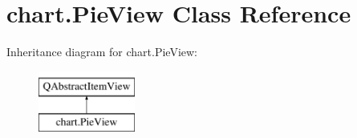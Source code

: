 \hypertarget{classchart_1_1PieView}{}\section{chart.\+Pie\+View Class Reference}
\label{classchart_1_1PieView}
Inheritance diagram for chart.\+Pie\+View\+:\begin{figure}[H]
\begin{center}
\leavevmode
\includegraphics[height=2.000000cm]{classchart_1_1PieView}
\end{center}
\end{figure}

